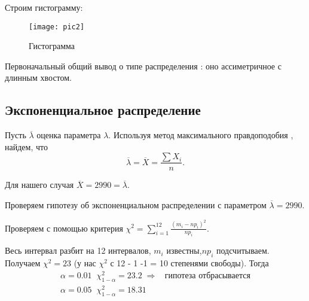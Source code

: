 Строим гистограмму:

\begin{figure}[h!]
\centering
\texttt{[image: pic2]}
\caption{Гистограмма}
\end{figure}


Первоначальный общий вывод о типе распределения : оно ассиметричное с длинным хвостом.

\subsection{Экспоненциальное распределение} %
Пусть $\overline{\lambda} $ оценка параметра $\lambda$. Используя метод максимального правдоподобия , найдем, что
\[ \overline{\lambda} = \overline{X} = \frac{\sum X_i}{n}.\]

Для нашего случая $\overline{X} = 2990 = \overline{\lambda}. $

Проверяем гипотезу об экспоненциальном распределении с параметром $\overline{\lambda} = 2990  
.$

Проверяем с помощью критерия $\chi^2 = \sum\limits_{i=1}^{12}\frac{(m_i - np_i)^2}{np_i}$.

Весь интервал разбит на 12 интервалов, $m_i$ известны,$np_i$ подсчитываем. Получаем $\chi^2 = 23$ (у нас $\chi^2$ с 12 - 1 -1 = 10 степенями свободы). Тогда
\begin{gather*}
	\alpha = 0.01 \;\; \chi^2_{1-\alpha} = 23.2 \;\Rightarrow\;\; \text{ гипотеза отбрасывается}\\
	\alpha = 0.05 \;\; \chi^2_{1-\alpha} = 18.31
\end{gather*}




